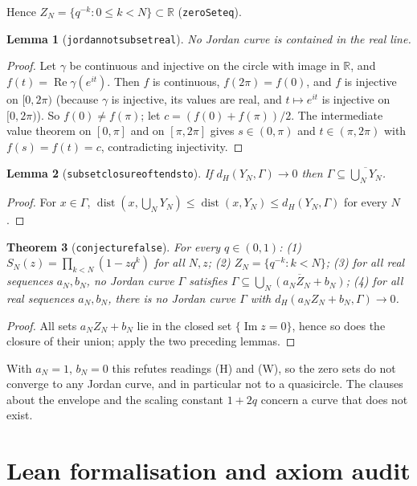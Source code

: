 \documentclass[11pt]{article}
\renewcommand{\_}{\oldus\allowbreak}
\newtheorem{theorem}{Theorem}
\newtheorem{lemma}[theorem]{Lemma}
\theoremstyle{definition}
\theoremstyle{remark}
\begin{document}
Hence $Z_N=\{q^{-k}:0\le k<N\}\subset\mathbb{R}$ (\texttt{zeroSet\_eq}).

\begin{lemma}[\texttt{jordan\_not\_subset\_real}]
No Jordan curve is contained in the real line.
\end{lemma}
\begin{proof}
Let $\gamma$ be continuous and injective on the circle with image in $\mathbb{R}$, and
$f(t)=\operatorname{Re}\gamma(e^{it})$. Then $f$ is continuous, $f(2\pi)=f(0)$, and $f$ is injective on
$[0,2\pi)$ (because $\gamma$ is injective, its values are real, and $t\mapsto e^{it}$ is injective on
$[0,2\pi)$). So $f(0)\ne f(\pi)$; let $c=(f(0)+f(\pi))/2$. The intermediate value theorem on $[0,\pi]$
and on $[\pi,2\pi]$ gives $s\in(0,\pi)$ and $t\in(\pi,2\pi)$ with $f(s)=f(t)=c$, contradicting
injectivity.
\end{proof}

\begin{lemma}[\texttt{subset\_closure\_of\_tendsto}]
If $d_H(Y_N,\Gamma)\to0$ then $\Gamma\subseteq\overline{\bigcup_NY_N}$.
\end{lemma}
\begin{proof}
For $x\in\Gamma$, $\operatorname{dist}(x,\bigcup_NY_N)\le\operatorname{dist}(x,Y_N)\le d_H(Y_N,\Gamma)$
for every $N$.
\end{proof}

\begin{theorem}[\texttt{conjecture\_7679\_false}]
For every $q\in(0,1)$: (1) $S_N(z)=\prod_{k<N}(1-zq^k)$ for all $N,z$; (2)
$Z_N=\{q^{-k}:k<N\}$; (3) for all real sequences $a_N,b_N$, no Jordan curve $\Gamma$ satisfies
$\Gamma\subseteq\overline{\bigcup_N(a_NZ_N+b_N)}$; (4) for all real sequences $a_N,b_N$, there is no
Jordan curve $\Gamma$ with $d_H(a_NZ_N+b_N,\Gamma)\to0$.
\end{theorem}
\begin{proof}
All sets $a_NZ_N+b_N$ lie in the closed set $\{\operatorname{Im}z=0\}$, hence so does the closure of
their union; apply the two preceding lemmas.
\end{proof}

With $a_N=1$, $b_N=0$ this refutes readings (H) and (W), so the zero sets do not converge to any
Jordan curve, and in particular not to a quasicircle. The clauses about the envelope and the scaling
constant $1+2q$ concern a curve that does not exist.

\section{Lean formalisation and axiom audit}
\end{document}
